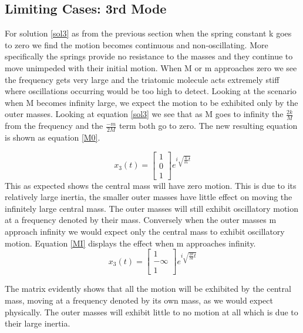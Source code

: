 \documentclass[hidelinks]{article}
\begin{document}
\begin{multicols}{2}
\section{Limiting Cases: 3rd Mode}
For solution \ref{sol3} as from the previous section when the spring constant k goes to zero we find the motion becomes continuous and non-oscillating. More specifically the springs provide no resistance to the masses and they continue to move unimpeded with their initial motion. When M or m approaches zero we see the frequency gets very large and the triatomic molecule acts extremely stiff where oscillations occurring would be too high to detect. Looking at the scenario when M becomes infinity large, we expect the motion to be exhibited only by the outer masses. Looking at equation \ref{sol3} we see that as M goes to infinity the $\frac{2k}{M}$ from the frequency and the $\frac{-m}{2M}$ term both go to zero. The new resulting equation is shown as equation \ref{M0}.

\begin{equation}
\label{M0}
x_3(t)=
\begin{bmatrix}
1\\
0\\
1
\end{bmatrix}
e^{i\sqrt{\frac{k}{m}t}}
\end{equation}
This as expected shows the central mass will have zero motion. This is due to its relatively large inertia, the smaller outer masses have little effect on moving the infinitely large central mass. The outer masses will still exhibit oscillatory motion at a frequency denoted by their mass. Conversely when the outer masses m approach infinity we would expect only the central mass to exhibit oscillatory motion. Equation \ref{MI} displays the effect when m approaches infinity.
\begin{equation}
\label{MI}
x_3(t)=
\begin{bmatrix}
1\\
-\infty \\
1
\end{bmatrix}
e^{i\sqrt{\frac{2k}{M}t}}
\end{equation}

The matrix evidently shows that all the motion will be exhibited by the central mass, moving at a frequency denoted by its own mass, as we would expect physically. The outer masses will exhibit little to no motion at all which is due to their large inertia.


\end{multicols}
\end{document}

